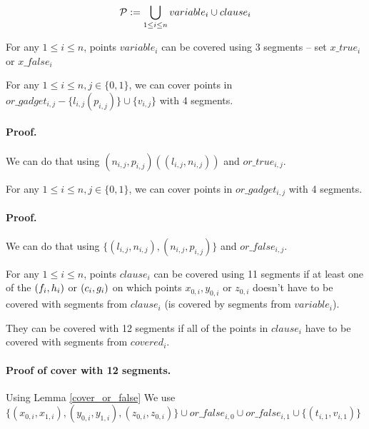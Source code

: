 $$\mathcal{P} := \bigcup_{1 \le i \le n} variable_i \cup clause_i $$

\begin{lemma}
\label{choose_variables_solution}
For any $1 \le i \le n$, points $variable_i$
can be covered using 3 segments -- set $x\_true_i$ or $x\_false_i$
\end{lemma}

\begin{lemma}
\label{cover_or_true}
For any $1 \le i \le n, j \in \{0, 1\}$, we can cover points in
$or\_gadget_{i, j} - \{l_{i, j} (p_{i, j})\} \cup \{v_{i, j}\}$
with 4 segments.
\end{lemma}

\paragraph{Proof.}
We can do that using  $(n_{i, j}, p_{i, j}) ((l_{i, j}, n_{i, j})) $
and $or\_true_{i, j}$.

\begin{lemma}
\label{cover_or_false}
For any $1 \le i \le n, j \in \{0, 1\}$, we can cover points in $or\_gadget_{i, j}$
with 4 segments.
\end{lemma}
\paragraph{Proof.}
We can do that using  $\{ (l_{i, j}, n_{i, j}), (n_{i, j}, p_{i, j})\}$
and $or\_false_{i, j}$.


\begin{lemma}
\label{cover_clauses_solution}
For any $1 \le i \le n$, points $clause_i$
can be covered using 11 segments if at least one of the $(f_i, h_i)$
or $(c_i, g_i)$ on which points $x_{0, i}, y_{0, i}$ or $z_{0, i}$
doesn't have to be covered with segments from $clause_i$ (is covered by
segments from $variable_i$).

They can be covered with 12 segments if all of the points in $clause_i$
have to be covered with segments from $covered_i$. 
\end{lemma}

\paragraph{Proof of cover with 12 segments.}
Using Lemma \ref{cover_or_false}
We use 
$\{ (x_{0, i}, x_{1, i}), (y_{0, i}, y_{1, i}),
(z_{0, i}, z_{0, i}) \} \cup or\_false_{i, 0} \cup or\_false_{i, 1} \cup \{ (t_{i, 1}, v_{i, 1}) \}$

